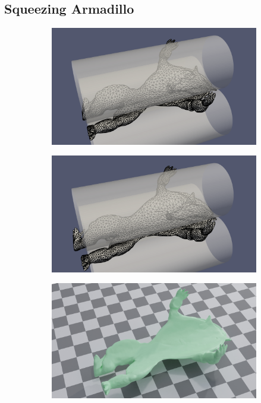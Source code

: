 \subsection{Squeezing Armadillo}
\begin{figure}[htp!]
	\centering
	\begin{subfigure}{.49\linewidth}
		\centering
		{\includegraphics[width=4.5in]{images/armadillo/pr0495_mesh.png}}
		\label{sfig:armadillo_pr_0495}
	\end{subfigure}%
	\begin{subfigure}{.49\linewidth}
		\centering
		{\includegraphics[width=4.5in]{images/armadillo/vc_mesh.png}}
		\label{sfig:armadillo_pr_0495}
	\end{subfigure}\par \medskip
	\begin{subfigure}{.49\linewidth}
		\centering
		{\includegraphics[width=4.5in]{images/armadillo/pr0495.jpg}}

\end{subfigure}
\end{figure}
